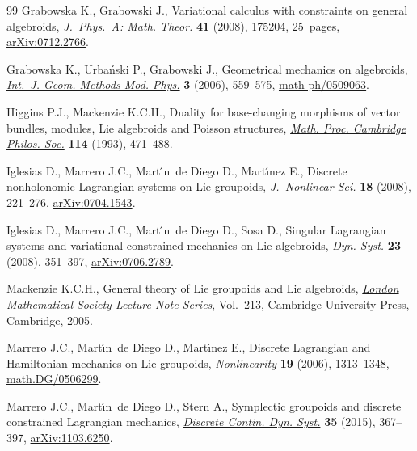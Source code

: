 \documentclass[pdftex]{sigma}
\numberwithin{equation}{section}
\begin{document}
\begin{thebibliography}{99}
Grabowska K., Grabowski J., Variational calculus with constraints on general
 algebroids, \href{https://doi.org/10.1088/1751-8113/41/17/175204}{\textit{J.~Phys.~A: Math. Theor.}} \textbf{41} (2008), 175204,
 25~pages, \href{http://arxiv.org/abs/0712.2766}{arXiv:0712.2766}.

Grabowska K., Urba\'nski P., Grabowski J., Geometrical mechanics on algebroids,
 \href{https://doi.org/10.1142/S0219887806001259}{\textit{Int.~J. Geom. Methods Mod. Phys.}} \textbf{3} (2006), 559--575,
 \href{http://arxiv.org/abs/math-ph/0509063}{math-ph/0509063}.

Higgins P.J., Mackenzie K.C.H., Duality for base-changing morphisms of vector
 bundles, modules, {L}ie algebroids and {P}oisson structures, \href{https://doi.org/10.1017/S0305004100071760}{\textit{Math.
 Proc. Cambridge Philos. Soc.}} \textbf{114} (1993), 471--488.

Iglesias D., Marrero J.C., Mart\'{\i}n~de Diego D., Mart\'{\i}nez E., Discrete
 nonholonomic {L}agrangian systems on {L}ie groupoids, \href{https://doi.org/10.1007/s00332-007-9012-8}{\textit{J.~Nonlinear
 Sci.}} \textbf{18} (2008), 221--276, \href{http://arxiv.org/abs/0704.1543}{arXiv:0704.1543}.

Iglesias D., Marrero J.C., Mart\'{\i}n~de Diego D., Sosa D., Singular
 {L}agrangian systems and variational constrained mechanics on {L}ie
 algebroids, \href{https://doi.org/10.1080/14689360802294220}{\textit{Dyn. Syst.}} \textbf{23} (2008), 351--397,
 \href{http://arxiv.org/abs/0706.2789}{arXiv:0706.2789}.

Mackenzie K.C.H., General theory of {L}ie groupoids and {L}ie algebroids,
 \href{https://doi.org/10.1017/CBO9781107325883}{\textit{London Mathematical Society Lecture Note Series}}, Vol.~213, Cambridge
 University Press, Cambridge, 2005.

Marrero J.C., Mart\'{\i}n~de Diego D., Mart\'{\i}nez E., Discrete {L}agrangian
 and {H}amiltonian mechanics on {L}ie groupoids, \href{https://doi.org/10.1088/0951-7715/19/6/006}{\textit{Nonlinearity}}
 \textbf{19} (2006), 1313--1348, \href{http://arxiv.org/abs/math.DG/0506299}{math.DG/0506299}.

Marrero J.C., Mart\'{\i}n~de Diego D., Stern A., Symplectic groupoids and
 discrete constrained {L}agrangian mechanics, \href{https://doi.org/10.3934/dcds.2015.35.367}{\textit{Discrete Contin. Dyn.
 Syst.}} \textbf{35} (2015), 367--397, \href{http://arxiv.org/abs/1103.6250}{arXiv:1103.6250}.


\end{thebibliography}
\end{document}
